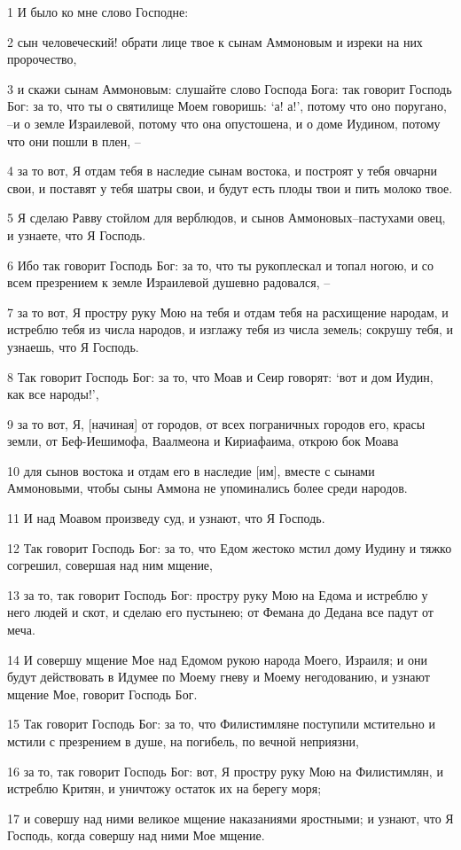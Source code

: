 \par 1 И было ко мне слово Господне:
\par 2 сын человеческий! обрати лице твое к сынам Аммоновым и изреки на них пророчество,
\par 3 и скажи сынам Аммоновым: слушайте слово Господа Бога: так говорит Господь Бог: за то, что ты о святилище Моем говоришь: `а! а!', потому что оно поругано, --и о земле Израилевой, потому что она опустошена, и о доме Иудином, потому что они пошли в плен, --
\par 4 за то вот, Я отдам тебя в наследие сынам востока, и построят у тебя овчарни свои, и поставят у тебя шатры свои, и будут есть плоды твои и пить молоко твое.
\par 5 Я сделаю Равву стойлом для верблюдов, и сынов Аммоновых--пастухами овец, и узнаете, что Я Господь.
\par 6 Ибо так говорит Господь Бог: за то, что ты рукоплескал и топал ногою, и со всем презрением к земле Израилевой душевно радовался, --
\par 7 за то вот, Я простру руку Мою на тебя и отдам тебя на расхищение народам, и истреблю тебя из числа народов, и изглажу тебя из числа земель; сокрушу тебя, и узнаешь, что Я Господь.
\par 8 Так говорит Господь Бог: за то, что Моав и Сеир говорят: `вот и дом Иудин, как все народы!',
\par 9 за то вот, Я, [начиная] от городов, от всех пограничных городов его, красы земли, от Беф-Иешимофа, Ваалмеона и Кириафаима, открою бок Моава
\par 10 для сынов востока и отдам его в наследие [им], вместе с сынами Аммоновыми, чтобы сыны Аммона не упоминались более среди народов.
\par 11 И над Моавом произведу суд, и узнают, что Я Господь.
\par 12 Так говорит Господь Бог: за то, что Едом жестоко мстил дому Иудину и тяжко согрешил, совершая над ним мщение,
\par 13 за то, так говорит Господь Бог: простру руку Мою на Едома и истреблю у него людей и скот, и сделаю его пустынею; от Фемана до Дедана все падут от меча.
\par 14 И совершу мщение Мое над Едомом рукою народа Моего, Израиля; и они будут действовать в Идумее по Моему гневу и Моему негодованию, и узнают мщение Мое, говорит Господь Бог.
\par 15 Так говорит Господь Бог: за то, что Филистимляне поступили мстительно и мстили с презрением в душе, на погибель, по вечной неприязни,
\par 16 за то, так говорит Господь Бог: вот, Я простру руку Мою на Филистимлян, и истреблю Критян, и уничтожу остаток их на берегу моря;
\par 17 и совершу над ними великое мщение наказаниями яростными; и узнают, что Я Господь, когда совершу над ними Мое мщение.

